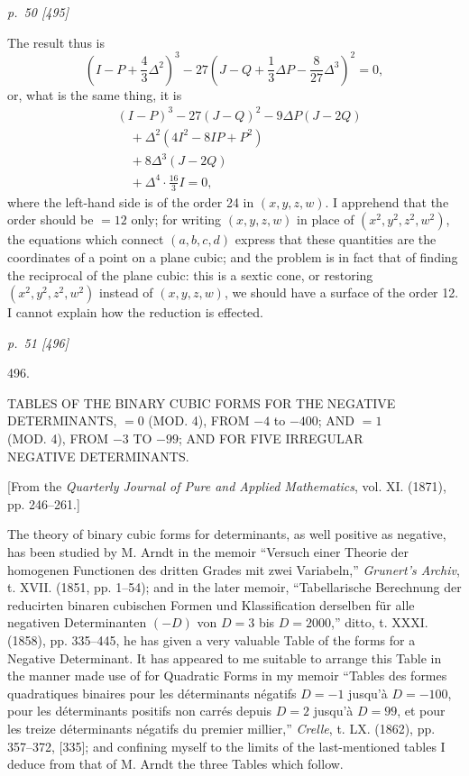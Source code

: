﻿\documentclass[11pt,a4paper]{article}
\theoremstyle{plain}
\theoremstyle{definition}
\begin{document}
\clearpage
\textit{p.~50 [495]}

The result thus is
\[
\left(I-P+\frac{4}{3}\Delta^2\right)^3
-27\left(J-Q+\frac{1}{3}\Delta P-\frac{8}{27}\Delta^3\right)^2=0,
\]
or, what is the same thing, it is
\[
\begin{aligned}
&(I-P)^3-27(J-Q)^2-9\Delta P(J-2Q)\\
&\quad+\Delta^2(4I^2-8IP+P^2)\\
&\quad+8\Delta^3(J-2Q)\\
&\quad+\Delta^4\cdot\frac{16}{3}I=0,
\end{aligned}
\]
where the left-hand side is of the order 24 in \((x,y,z,w)\). I apprehend
that the order should be \(=12\) only; for writing \((x,y,z,w)\) in place
of \((x^2,y^2,z^2,w^2)\), the equations which connect \((a,b,c,d)\)
express that these quantities are the coordinates of a point on a plane
cubic; and the problem is in fact that of finding the reciprocal of the
plane cubic: this is a sextic cone, or restoring \((x^2,y^2,z^2,w^2)\)
instead of \((x,y,z,w)\), we should have a surface of the order 12. I
cannot explain how the reduction is effected.

\clearpage
\textit{p.~51 [496]}

\begin{center}
{\Large 496.}

\vspace{1.5em}

{\large TABLES OF THE BINARY CUBIC FORMS FOR THE NEGATIVE}\\
{\large DETERMINANTS, \(=0\) (MOD. 4), FROM \(-4\) to \(-400\); AND \(=1\)}\\
{\large (MOD. 4), FROM \(-3\) TO \(-99\); AND FOR FIVE IRREGULAR}\\
{\large NEGATIVE DETERMINANTS.}

\vspace{1em}

[From the \textit{Quarterly Journal of Pure and Applied Mathematics},
vol. XI. (1871), pp. 246--261.]
\end{center}

The theory of binary cubic forms for determinants, as well positive as
negative, has been studied by M. Arndt in the memoir ``Versuch einer
Theorie der homogenen Functionen des dritten Grades mit zwei Variabeln,''
\textit{Grunert's Archiv}, t. XVII. (1851, pp. 1--54); and in the later
memoir, ``Tabellarische Berechnung der reducirten binaren cubischen Formen
und Klassification derselben f\"ur alle negativen Determinanten \((-D)\)
von \(D=3\) bis \(D=2000\),'' ditto, t. XXXI. (1858), pp. 335--445, he has
given a very valuable Table of the forms for a Negative Determinant. It
has appeared to me suitable to arrange this Table in the manner made use of
for Quadratic Forms in my memoir ``Tables des formes quadratiques binaires
pour les d\'eterminants n\'egatifs \(D=-1\) jusqu'\`a \(D=-100\), pour les
d\'eterminants positifs non carr\'es depuis \(D=2\) jusqu'\`a \(D=99\), et
pour les treize d\'eterminants n\'egatifs du premier millier,''
\textit{Crelle}, t. LX. (1862), pp. 357--372, [335]; and confining myself
to the limits of the last-mentioned tables I deduce from that of M. Arndt
the three Tables which follow.
\end{document}
